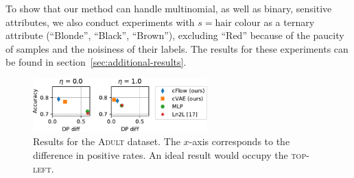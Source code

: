 To show that our method can handle multinomial, as well as binary, sensitive attributes, we also conduct experiments with $s=\textrm{hair colour}$ as a ternary attribute (``Blonde'', ``Black'', ``Brown''), excluding ``Red'' because of the paucity of samples and the noisiness of their labels. The results for these experiments can be found in section~\ref{sec:additional-results}.

\begin{figure}[tb]
  \centering
  \includegraphics[width=0.6\textwidth]{paper2/Figures/nosinn_adult_multiplot_mini_diff.pdf}
  \caption{
      Results for the \textsc{Adult} dataset.
      The $x$-axis corresponds to the difference in positive rates.
      An ideal result would occupy the \textsc{top-left}.
  }%
  \label{fig:adult-chart}
\end{figure}

